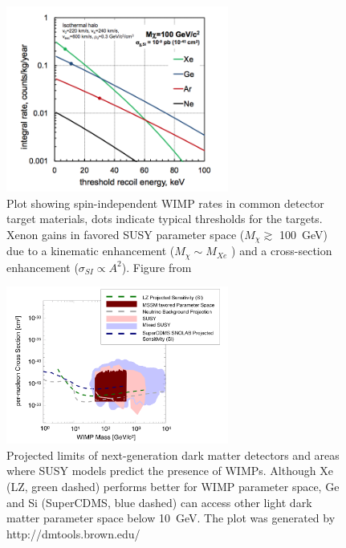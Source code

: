 \begin{figure}[htbp]
\begin{center}
\includegraphics[width=0.65\textwidth]{figures/lxetpcs/wimp_rates.png}
\caption{Plot showing spin-independent WIMP rates in common detector target materials, dots indicate typical thresholds for the targets. Xenon gains in favored SUSY parameter space ($M_{\chi} \gtrsim$ 100~GeV) due to a kinematic enhancement ($M_{\chi} \sim M_{Xe}$ ) and a cross-section enhancement ($\sigma_{SI} \propto A^{2}$). Figure from \cite{Chepel2013}}
\label{fig:bands}
\end{center}
\end{figure}

\begin{figure}[htbp]
\begin{center}
\includegraphics[width=0.65\textwidth]{figures/lxetpcs/WIMPblobs.png}
\caption{Projected limits of next-generation dark matter detectors and areas where SUSY models predict the presence of WIMPs. Although Xe (LZ, green dashed) performs better for WIMP parameter space, Ge and Si (SuperCDMS, blue dashed) can access other light dark matter parameter space below 10~GeV. The plot was generated by http://dmtools.brown.edu/ }
\label{fig:WIMPblobs}
\end{center}
\end{figure}





